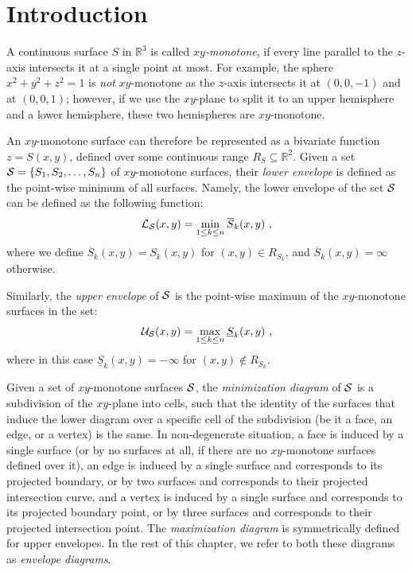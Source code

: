 
\section{Introduction}

A continuous surface $S$ in ${\mathbb R}^3$ is called {\em $xy$-monotone},
if every line parallel to the $z$-axis intersects it at a single point
at most. For example, the sphere $x^2 + y^2 + z^2 = 1$ is {\em not}
$xy$-monotone as the $z$-axis intersects it at $(0, 0, -1)$ and at
$(0, 0, 1)$; however, if we use the $xy$-plane to split it to an
upper hemisphere and a lower hemisphere, these two hemispheres are
$xy$-monotone.

An $xy$-monotone surface can therefore be represented as a
bivariate function $z = S(x,y)$, defined over some continuous range
$R_S \subseteq {\mathbb R}^2$. Given a set 
${\cal S} = \{ S_1, S_2, \ldots, S_n \}$ of $xy$-monotone surfaces,
their {\em lower envelope} is defined
as the point-wise minimum of all surfaces. Namely, the lower envelope
of the set ${\cal S}$ can be defined as the following function:
\begin{eqnarray*}
{\cal L}_{{\cal S}} (x,y) = \min_{1 \leq k \leq n}{\overline{S}_k (x,y)} \ ,
\end{eqnarray*}
where we define $\overline{S}_k(x,y) = S_k(x,y)$ for $(x,y) \in R_{S_k}$, and 
$\overline{S}_k(x,y) = \infty$ otherwise.

Similarly, the {\em upper envelope} of ${\cal S}$ is the point-wise maximum of
the $xy$-monotone surfaces in the set:
\begin{eqnarray*}
{\cal U}_{{\cal S}} (x,y) = \max_{1 \leq k \leq n}{\underline{S}_k (x,y)} \ ,
\end{eqnarray*}
where in this case $\underline{S}_k(x,y) = -\infty$ for $(x,y) \not\in
R_{S_k}$.

Given a set of $xy$-monotone surfaces ${\cal S}$, the {\em minimization
diagram} of ${\cal S}$ is a subdivision of the $xy$-plane into cells,
such that the identity of the surfaces that induce the lower diagram
over a specific cell of the subdivision (be it a face, an edge, or
a vertex) is the same. In non-degenerate situation, a face is
induced by a single surface (or by no surfaces at all, if there are
no $xy$-monotone surfaces defined over it), an edge is induced by a 
single surface and corresponds to its projected boundary, or by two 
surfaces and corresponds to their projected intersection curve, and
a vertex is induced by a single surface and corresponds to its projected 
boundary point, or by three surfaces and corresponds to their projected 
intersection point. The {\em maximization diagram} is symmetrically 
defined for upper envelopes. In the rest of this chapter, we refer to 
both these diagrams as {\em envelope diagrams}.

